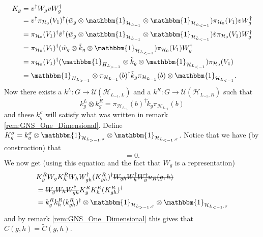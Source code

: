 \documentclass[12pt,a4paper,twoside]{article}
\newcommand{\stkout}[1]{\ifmmode\text{\sout{\ensuremath{#1}}}\else\sout{#1}\fi}
\newcommand{\UU}{\mathcal U}
\newcommand{\HH}{\mathcal H}
\newcommand{\ZZ}{\mathbb Z}
\newcommand{\id}{\mathbbm{1}}
\theoremstyle{definition}
\numberwithin{equation}{section}
\begin{document}
\begin{align}
	K_g&=v^\dagger W_g v W_g^\dagger\\
	&=v^\dagger \pi_{\HH_0}(V_1)^{\dagger}(\tilde{w}_g\otimes\id_{\HH_{L_{-1}}}\otimes\id_{\HH_{L_{<-1}}}) \pi_{\HH_0}(V_1) v W_g^\dagger\\
	&=\pi_{\HH_0}(V_1)^{\dagger}\tilde v^\dagger(\tilde{w}_g\otimes\id_{\HH_{L_{-1}}}\otimes\id_{\HH_{L_{<-1}}}) \tilde v \pi_{\HH_0}(V_1) W_g^\dagger\\
	&=\pi_{\HH_0}(V_1)^{\dagger}(\tilde{w}_g\otimes\tilde{k}_g\otimes\id_{\HH_{L_{<-1}}}) \pi_{\HH_0}(V_1) W_g^\dagger\\
	&=\pi_{\HH_0}(V_1)^{\dagger}(\id_{H_{L_{>-1}}}\otimes \tilde k_g \otimes\id_{\HH_{L_{<-1}}}) \pi_{\HH_0}(V_1)\\
	&=\id_{H_{L_{>-1}}}\otimes \pi_{\HH_{L_{-1}}}(b)^\dagger \tilde k_g \pi_{\HH_{L_{-1}}}(b) \otimes\id_{\HH_{L_{<-1}}} .
\end{align}
Now there exists a $k^L:G\rightarrow \UU(\HH_{L_{-1},L})$ and a $k^R:G\rightarrow \UU(\HH_{L_{-1},R})$ such that
\begin{equation}
	k^L_g\otimes k^R_g=\pi_{\HH_{L_{-1}}}(b)^\dagger \tilde k_g \pi_{\HH_{L_{-1}}}(b)
\end{equation}
and these $k^\sigma_g$ will satisfy what was written in remark \ref{rem:GNS_One_Dimensional}. Define $K^\sigma_g=k^\sigma_g\otimes\id_{\HH_{L_{>-1},\sigma}}\otimes\id_{\HH_{L_{<-1},\sigma}}$. Notice that we have (by construction) that
\begin{equation}
	[K^\sigma_g\otimes\id_{\HH_{\ZZ^2/\sigma}},W_g]=0.
\end{equation}
We now get (using this equation and the fact that $W_g$ is a representation)
\begin{align}
	&K_g^R W_g K_h^R W_h W_{gh}^\dagger (K_{gh}^R)^\dagger \stkout{W_{gh}W_h^\dagger W_g^\dagger u_R(g,h)}\\
	&=\stkout{W_g W_h W_{gh}^\dagger} K_g^R K_h^R (K_{gh}^R)^\dagger\\
	&=k_g^R k_h^R (k_{gh}^R)^\dagger\otimes \id_{\HH_{L_{>-1},\sigma}}\otimes\id_{\HH_{L_{<-1},\sigma}}
\end{align}
and by remark \ref{rem:GNS_One_Dimensional} this gives that $C(g,h)=\tilde{C}(g,h)$.
\end{document}
